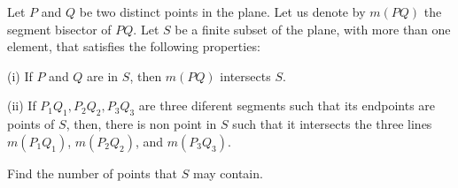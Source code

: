 Let $P$ and $Q$ be two distinct points in the plane. Let us denote by $m(PQ)$ the segment bisector of $PQ$. Let $S$ be a finite subset of the plane, with more than one element, that satisfies the following properties:

(i) If $P$ and $Q$ are in $S$,  then $m(PQ)$ intersects $S$.

(ii) If $P_1Q_1, P_2Q_2, P_3Q_3$ are three diferent segments such that its endpoints are points of $S$,  then, there is non point in $S$ such that it intersects the three lines $m(P_1Q_1)$,  $m(P_2Q_2)$,  and $m(P_3Q_3)$.

Find the number of points that $S$ may contain.